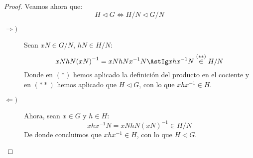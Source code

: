 \begin{teo}
\begin{proof}
        \noindent
        Veamos ahora que:
        \begin{equation*}
            H\lhd G \Longleftrightarrow H/N \lhd G/N
        \end{equation*}
        \begin{description}
            \item [$\Longrightarrow)$] Sean $xN\in G/N$, $hN\in H/N$:
                \begin{equation*}
                    xNhN{(xN)}^{-1} = xNhNx^{-1}N \AstIg xhx^{-1}N \stackrel{(\ast\ast)}{\in} H/N
                \end{equation*}
                Donde en $(\ast)$ hemos aplicado la definición del producto en el cociente y en $(\ast\ast)$ hemos aplicado que $H\lhd G$, con lo que $xhx^{-1}\in H$.
            \item [$\Longleftarrow)$] Ahora, sean $x\in G$ y $h\in H$:
                \begin{equation*}
                    xhx^{-1}N = xN hN {(xN)}^{-1} \in H/N
                \end{equation*}
                De donde concluimos que $xhx^{-1}\in H$, con lo que $H\lhd G$.
        \end{description}


\end{proof}
\end{teo}
